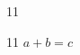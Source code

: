 \documentclass[paper=A4]{ropas-poster}
\begin{document}
\begin{postergrid}{1}{1}
\begin{posterblock}{1}{1}
\begin{math}a+b=c\end{math}
\end{posterblock}
\end{postergrid}
\end{document}
